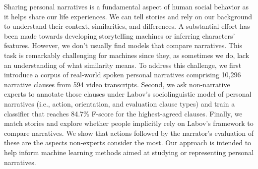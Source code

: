 Sharing personal narratives is a fundamental aspect of human social behavior as it helps share our life experiences. We can tell stories and rely on our background to understand their context, similarities, and differences. A substantial effort has been made towards developing storytelling machines or inferring characters' features. However, we don't usually find models that compare narratives. This task is remarkably challenging for machines since they, as sometimes we do, lack an understanding of what similarity means. To address this challenge, we first introduce a corpus of real-world spoken personal narratives comprising 10,296 narrative clauses from 594 video transcripts. Second, we ask non-narrative experts to annotate those clauses under Labov's sociolinguistic model of personal narratives (i.e., action, orientation, and evaluation clause types) and train a classifier that reaches 84.7\% F-score for the highest-agreed clauses. Finally, we match stories and explore whether people implicitly rely on Labov's framework to compare narratives. We show that actions followed by the narrator's evaluation of these are the aspects non-experts consider the most. Our approach is intended to help inform machine learning methods aimed at studying or representing personal narratives.
